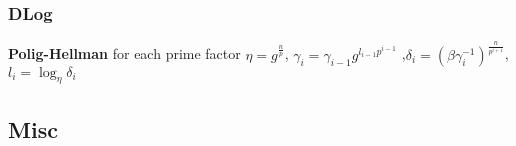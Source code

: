 \documentclass[twoside, 11pt]{article}
\begin{document}
            \subsubsection*{DLog}
                \textbf{Polig-Hellman} for each prime factor $\eta = g^{\frac{n}{p}}$, $\gamma_{i}=\gamma_{i-1}g^{l_{i-1}p^{i-1}}$ ,$\delta_{i}=(\beta\gamma_{i}^{-1})^{\frac{n}{p^{i+1}}}$, $l_{i}=\log_{\eta}\delta_{i}$

        \subsection*{Misc}
\end{document}
